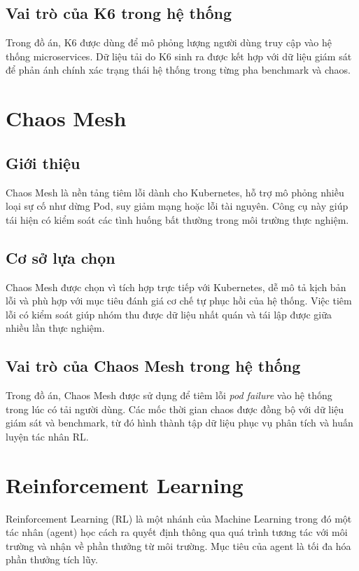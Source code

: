 \subsection{Vai trò của K6 trong hệ thống}

Trong đồ án, K6 được dùng để mô phỏng lượng người dùng truy cập vào hệ thống microservices. Dữ liệu tải do K6 sinh ra được kết hợp với dữ liệu giám sát để phản ánh chính xác trạng thái hệ thống trong từng pha benchmark và chaos.

\section{Chaos Mesh}

\subsection{Giới thiệu}

Chaos Mesh là nền tảng tiêm lỗi dành cho Kubernetes, hỗ trợ mô phỏng nhiều loại sự cố như dừng Pod, suy giảm mạng hoặc lỗi tài nguyên. Công cụ này giúp tái hiện có kiểm soát các tình huống bất thường trong môi trường thực nghiệm.

\subsection{Cơ sở lựa chọn}

Chaos Mesh được chọn vì tích hợp trực tiếp với Kubernetes, dễ mô tả kịch bản lỗi và phù hợp với mục tiêu đánh giá cơ chế tự phục hồi của hệ thống. Việc tiêm lỗi có kiểm soát giúp nhóm thu được dữ liệu nhất quán và tái lập được giữa nhiều lần thực nghiệm.

\subsection{Vai trò của Chaos Mesh trong hệ thống}

Trong đồ án, Chaos Mesh được sử dụng để tiêm lỗi \textit{pod failure} vào hệ thống trong lúc có tải người dùng. Các mốc thời gian chaos được đồng bộ với dữ liệu giám sát và benchmark, từ đó hình thành tập dữ liệu phục vụ phân tích và huấn luyện tác nhân RL.

\section{Reinforcement Learning}

Reinforcement Learning (RL) là một nhánh của Machine Learning trong đó một tác nhân (agent) học cách ra quyết định thông qua quá trình tương tác với môi trường và nhận về phần thưởng từ môi trường. Mục tiêu của agent là tối đa hóa phần thưởng tích lũy.

